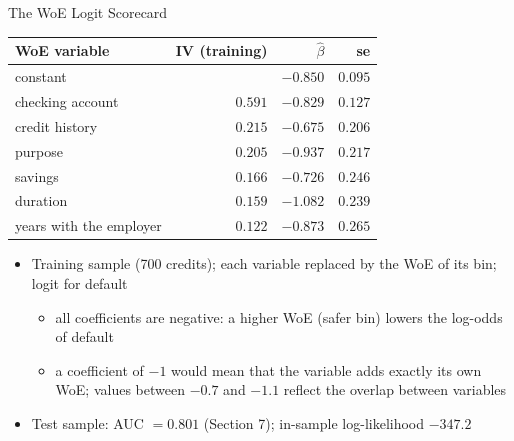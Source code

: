 \begin{frame}{The WoE Logit Scorecard}
\itemsize{\footnotesize}
\begin{center}
\scriptsize
\begin{tabular}{lrrr}
\toprule
WoE variable & IV (training) & $\hat\beta$ & se \\
\midrule
constant & & $-0.850$ & $0.095$ \\
checking account & $0.591$ & $-0.829$ & $0.127$ \\
credit history & $0.215$ & $-0.675$ & $0.206$ \\
purpose & $0.205$ & $-0.937$ & $0.217$ \\
savings & $0.166$ & $-0.726$ & $0.246$ \\
duration & $0.159$ & $-1.082$ & $0.239$ \\
years with the employer & $0.122$ & $-0.873$ & $0.265$ \\
\bottomrule
\end{tabular}
\end{center}
\begin{itemize}
    \item Training sample (700 credits); each variable replaced by the WoE of its bin; logit for default
    \begin{itemize}
        \item all coefficients are negative: a higher WoE (safer bin) lowers the log-odds of default
        \item a coefficient of $-1$ would mean that the variable adds exactly its own WoE; values between $-0.7$ and $-1.1$ reflect the overlap between variables
    \end{itemize}
    \item Test sample: AUC $= 0.801$ (Section 7); in-sample log-likelihood $-347.2$
\end{itemize}
\end{frame}

